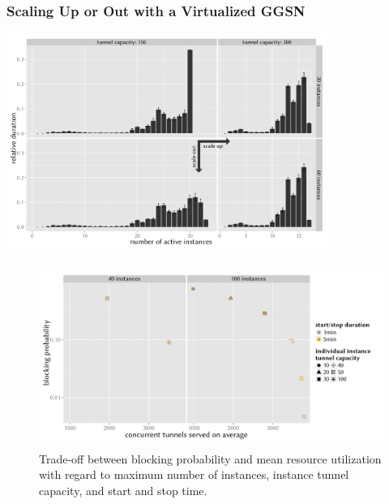 \documentclass{beamer}
\begin{document}
\begin{frame}
	\frametitle{Scaling Up or Out with a Virtualized GGSN}
	
	\begin{center}
		\includegraphics[height=7cm]{../../chapters/041-mobilenetsmeasuring/images/R-virtualized-instanceuse-barplot.pdf}
	\end{center}
\end{frame}



\begin{frame}
	\begin{figure}
		\centering
		\includegraphics[height=6cm]{../../chapters/041-mobilenetsmeasuring/images/R-virtualized-startstop-tunnelusage-blocking-comparison.pdf}
		\caption{Trade-off between blocking probability and mean resource utilization with regard to maximum number of instances, instance tunnel capacity, and start and stop time.}
	\end{figure}
\end{frame}
\end{document}
